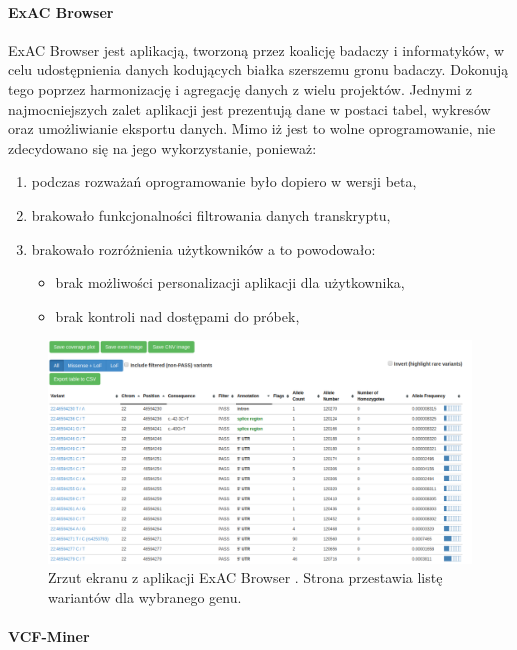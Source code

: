 \documentclass[a4paper,12pt,twoside]{article}
\begin{document}
\paragraph{ExAC Browser} ExAC Browser \cite{exac} \cite{exacCite} jest aplikacją, tworzoną przez koalicję badaczy i informatyków, w celu
udostępnienia danych kodujących białka szerszemu gronu badaczy.
Dokonują tego poprzez harmonizację i agregację danych z wielu projektów.
Jednymi z najmocniejszych zalet aplikacji jest prezentują dane w postaci tabel, wykresów oraz umożliwianie eksportu danych.
Mimo iż jest to wolne oprogramowanie, nie zdecydowano się na jego wykorzystanie, ponieważ:
\begin{enumerate}[1)]
\item podczas rozważań oprogramowanie było dopiero w wersji beta,
\item brakowało funkcjonalności filtrowania danych transkryptu,
\item brakowało rozróżnienia użytkowników a to powodowało:
\begin{itemize}
\item brak możliwości personalizacji aplikacji dla użytkownika,
\item brak kontroli nad dostępami do próbek,
\end{itemize}
\end{enumerate}

\begin{figure}[h]
\includegraphics[width=\linewidth]{obrazy/exac/broad.png}
\caption{Zrzut ekranu z aplikacji ExAC Browser \cite{exac}. Strona przestawia listę wariantów dla wybranego genu.}
  \label{fig:broadpic}
\end{figure}

\newpage

\paragraph{VCF-Miner}
\end{document}
